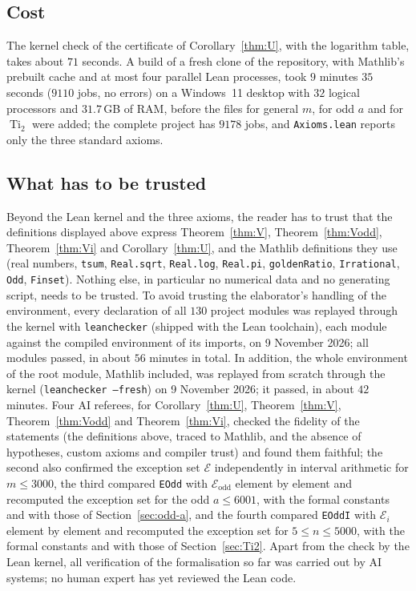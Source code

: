\documentclass[11pt]{amsart}
\theoremstyle{definition}
\theoremstyle{remark}
\numberwithin{equation}{section}
\newcommand{\cE}{\mathcal{E}}
\newcommand{\Ti}{\operatorname{Ti}}
\newcommand{\lean}[1]{{\def\_{\textunderscore\allowbreak}\texttt{#1}}}
\begin{document}
\subsection{Cost}
The kernel check of the certificate of Corollary~\ref{thm:U}, with the logarithm table, takes about $71$ seconds. A build
of a fresh clone of the repository, with Mathlib's prebuilt cache and at most four parallel Lean processes, took
$9$ minutes $35$ seconds ($9110$ jobs, no errors) on a Windows~11 desktop with $32$ logical processors and $31.7$\,GB of
RAM, before the files for general $m$, for odd $a$ and for $\Ti_2$ were added; the complete project has $9178$ jobs, and
\lean{Axioms.lean} reports only the three standard axioms.

\subsection{What has to be trusted}
Beyond the Lean kernel and the three axioms, the reader has to trust that the definitions displayed above express
Theorem~\ref{thm:V}, Theorem~\ref{thm:Vodd}, Theorem~\ref{thm:Vi} and Corollary~\ref{thm:U}, and the Mathlib
definitions they use (real
numbers, \lean{tsum}, \lean{Real.sqrt}, \lean{Real.log}, \lean{Real.pi}, \lean{goldenRatio}, \lean{Irrational},
\lean{Odd}, \lean{Finset}). Nothing else, in particular no numerical data and no generating script, needs to be trusted.
To avoid trusting the elaborator's handling of the environment, every declaration of all $130$ project modules was
replayed through the kernel with \lean{leanchecker} (shipped with the Lean toolchain), each module against the compiled
environment of its imports, on 9 November 2026; all modules passed, in about $56$ minutes in total.
In addition, the whole environment of the root module, Mathlib included, was replayed from scratch through the kernel
(\lean{leanchecker --fresh}) on 9 November 2026; it passed, in about $42$ minutes. Four AI referees, for Corollary~\ref{thm:U},
Theorem~\ref{thm:V}, Theorem~\ref{thm:Vodd} and Theorem~\ref{thm:Vi}, checked the fidelity of the statements (the
definitions above, traced to Mathlib, and the absence of hypotheses, custom axioms and compiler trust) and found them
faithful; the second also confirmed the exception set $\cE$ independently in interval arithmetic for $m\le3000$, the
third compared \lean{EOdd} with $\cE_{\mathrm{odd}}$ element by element and recomputed the exception set for the odd
$a\le6001$, with the formal constants and with those of Section~\ref{sec:odd-a}, and the fourth compared \lean{EOddI}
with $\cE_i$ element by element and recomputed the exception set for $5\le n\le5000$, with the formal constants and with
those of Section~\ref{sec:Ti2}. Apart from the check by the Lean kernel, all verification of
the formalisation so far was carried out by AI systems; no human expert has yet reviewed the Lean code.
\end{document}
